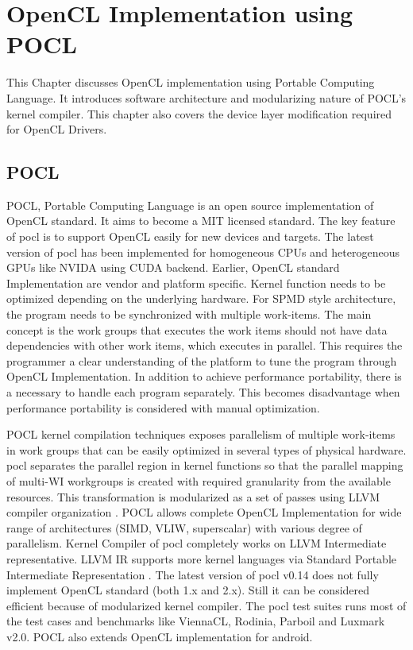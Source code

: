\chapter{OpenCL Implementation using POCL}
\label{ch3_OpenCL_Implementation_using_POCL}

This Chapter discusses OpenCL implementation using Portable Computing Language. It introduces software architecture and modularizing nature of POCL’s kernel compiler. This chapter also covers the device layer modification required for OpenCL Drivers.

\section{POCL}
POCL, Portable Computing Language is an open source implementation of OpenCL standard. It aims to become a MIT licensed standard. The key feature of pocl is to support OpenCL easily for new devices and targets. The latest version of pocl has been implemented for homogeneous CPUs and heterogeneous GPUs like NVIDA using CUDA backend. Earlier, OpenCL standard Implementation are vendor and platform specific. Kernel function needs to be optimized depending on the underlying hardware. For SPMD style architecture, the program needs to be synchronized with multiple work-items. The main concept is the work groups that executes the work items should not have data dependencies with other work items, which executes in parallel. This requires the programmer a clear understanding of the platform to tune the program through OpenCL Implementation. In addition to achieve performance portability, there is a necessary to handle each program separately. This becomes disadvantage when performance portability is considered with manual optimization.

POCL kernel compilation techniques exposes parallelism of multiple work-items in work groups that can be easily optimized in several types of physical hardware. pocl separates the parallel region in kernel functions so that the parallel mapping of multi-WI workgroups is created with required granularity from the available resources. This transformation is modularized as a set of passes using LLVM compiler organization \cite{16}. POCL allows complete OpenCL Implementation for wide range of architectures (SIMD, VLIW, superscalar) with various degree of parallelism. Kernel Compiler of pocl completely works on LLVM Intermediate representative. LLVM IR supports more kernel languages via Standard Portable Intermediate Representation \cite{17}. The latest version of pocl v0.14 does not fully implement OpenCL standard (both 1.x and 2.x). Still it can be considered efficient because of modularized kernel compiler. The pocl test suites runs most of the test cases and benchmarks like ViennaCL, Rodinia, Parboil and Luxmark v2.0. POCL also extends OpenCL implementation for android.

